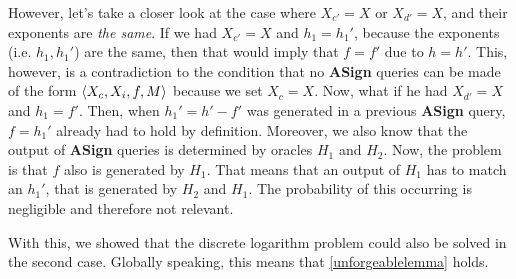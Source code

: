 However, let's take a closer look at the case where \(X_{c'} = X\) or \(X_{d'} = X\), and their exponents are \textit{the same}.
If we had \(X_{c'} = X\) and \(h_1 = h_1'\), because the exponents (i.e. \(h_1, h_1'\)) are the same, then that would imply that \(f = f'\) due to \(h = h'\).
This, however, is a contradiction to the condition that no \textbf{ASign} queries can be made of the form \(\langle X_c, X_i, f, M \rangle\) because we set \(X_c = X\).
Now, what if he had \(X_{d'} = X\) and \(h_1 = f'\).
Then, when \(h_1' = h' - f'\) was generated in a previous \textbf{ASign} query, \(f = h_1'\) already had to hold by definition.
Moreover, we also know that the output of \textbf{ASign} queries is determined by oracles \(H_1\) and \(H_2\).
Now, the problem is that \(f\) also is generated by \(H_1\). That means that an output of \(H_1\) has to match an \(h_1'\), that is generated by \(H_2\) and \(H_1\).
The probability of this occurring is negligible and therefore not relevant. 

With this, we showed that the discrete logarithm problem could also be solved in the second case.
Globally speaking, this means that \cref{unforgeablelemma} holds.
